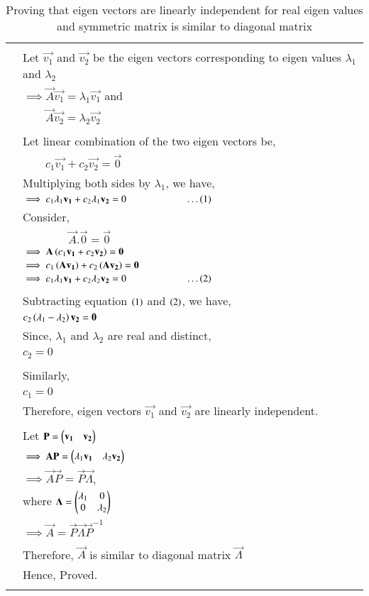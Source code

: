 \begin{longtable}{|c|l|}
	&\\
	& Let $\vec{v_1}$ and $\vec{v_2}$ be the eigen vectors corresponding to eigen values $\lambda_1$ and $\lambda_2$\\
	& $\implies \vec{A}\vec{v_1}=\lambda_1\vec{v_1}$ and\\
	& $\qquad \vec{A}\vec{v_2}=\lambda_2\vec{v_2}$\\
	&\\
	& Let linear combination of the two eigen vectors be,\\
	& $\qquad c_1\vec{v_1}+c_2\vec{v_2}=\vec{0}$\\
	& Multiplying both sides by $\lambda_1$, we have,\\
	& $\implies c_1\lambda_1\mathbf{v_1}+c_2\lambda_1\mathbf{v_2}=0\qquad \qquad \qquad \dots \left(1\right)$\\
	& Consider,\\
	& $\qquad\qquad\vec{A}.\vec{0}=\vec{0}$\\
	& $\implies \mathbf{A}\left(c_1\mathbf{v_1}+c_2\mathbf{v_2}\right)=\mathbf{0}$\\
	& $\implies c_1\left(\mathbf{A}\mathbf{v_1}\right)+ c_2\left(\mathbf{A}\mathbf{v_2}\right)=\mathbf{0}$\\
	& $\implies c_1\lambda_1\mathbf{v_1}+c_2\lambda_2\mathbf{v_2}=0\qquad \qquad \qquad \dots \left(2\right)$\\
	&\\
	& Subtracting equation $\left(1\right)$ and $\left(2\right)$, we have,\\
	& $c_2\left(\lambda_1-\lambda_2\right)\mathbf{v_2}=\mathbf{0}$\\
	& Since, $\lambda_1$ and $\lambda_2$ are real and distinct,\\
	& $c_2=0$\\
	&\\
	& Similarly,\\
	& $c_1=0$\\
	& Therefore, eigen vectors $\vec{v_1}$ and $\vec{v_2}$ are linearly independent.\\
	&\\
	& Let $\mathbf{P}=\begin{pmatrix}\mathbf{v_1}& \mathbf{v_2}\end{pmatrix}$\\
	& $\implies \mathbf{A}\mathbf{P}=\begin{pmatrix}\lambda_1 \mathbf{v_1}&\lambda_2 \mathbf{v_2}\end{pmatrix}$\\
	& $\implies \vec{A}\vec{P}=\vec{P}\vec{\Lambda}$, \\
	& where $\mathbf{\Lambda}=\begin{pmatrix}\lambda_1&0\\0&\lambda_2\end{pmatrix}$\\
	& $\implies \vec{A}=\vec{P}\vec{\Lambda} \vec{P}^{-1}$\\
	&\\
	& Therefore, $\vec{A}$ is similar to diagonal matrix $\vec{\Lambda}$\\
	& Hence, Proved.\\
	\hline
	\caption{Proving that eigen vectors are linearly independent for real eigen values and symmetric matrix is similar to diagonal matrix}
    \label{eq:solutions/6/2/10/table:2}
\end{longtable}
